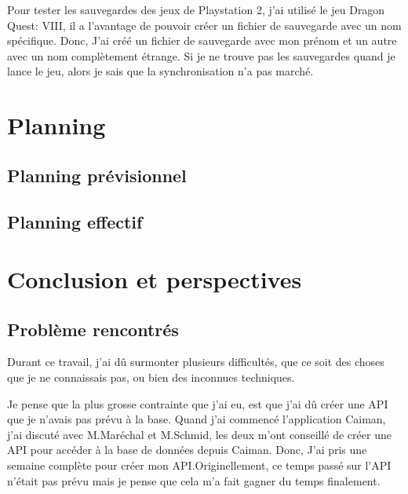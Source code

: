 \documentclass[a4paper,12pt,french]{sphinxmanual}
\begin{document}
\sphinxAtStartPar
Pour tester les sauvegardes des jeux de Playstation 2, j’ai utilisé le jeu Dragon Quest: VIII, il a l’avantage de pouvoir créer un fichier de sauvegarde avec un nom spécifique. Donc, J’ai créé un fichier de sauvegarde avec mon prénom et un autre avec un nom complètement étrange. Si je ne trouve pas les sauvegardes quand je lance le jeu, alors je sais que la synchronisation n’a pas marché.


\chapter{Planning}
\label{\detokenize{planning:planning}}\label{\detokenize{planning::doc}}

\section{Planning prévisionnel}
\label{\detokenize{planning:planning-previsionnel}}
\sphinxAtStartPar
{}

\sphinxAtStartPar
{}


\section{Planning effectif}
\label{\detokenize{planning:planning-effectif}}
\sphinxAtStartPar
{}

\sphinxAtStartPar
{}


\chapter{Conclusion et perspectives}
\label{\detokenize{conclusion:conclusion-et-perspectives}}\label{\detokenize{conclusion::doc}}

\section{Problème rencontrés}
\label{\detokenize{conclusion:probleme-rencontres}}
\sphinxAtStartPar
Durant ce travail, j’ai dû surmonter plusieurs difficultés, que ce soit des choses que je ne connaissais pas, ou bien des inconnues techniques.

\sphinxAtStartPar
Je pense que la plus grosse contrainte que j’ai eu, est que j’ai dû créer une API que je n’avais pas prévu à la base. Quand j’ai commencé l’application Caiman, j’ai discuté avec M.Maréchal et M.Schmid, les deux m’ont conseillé de créer une API pour accéder à la base de données depuis Caiman. Donc, J’ai pris une semaine complète pour créer mon API.Originellement, ce temps passé sur l’API n’était pas prévu mais je pense que cela m’a fait gagner du temps finalement.
\end{document}
